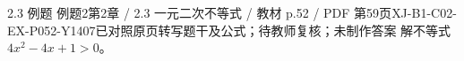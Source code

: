 \par\noindent\begin{minipage}{\linewidth}
\begin{bankitem}{2.3 例题 例题2}{第2章 / 2.3 一元二次不等式 / 教材 p.52 / PDF 第59页}{XJ-B1-C02-EX-P052-Y1407}{已对照原页转写题干及公式；待教师复核；未制作答案}
解不等式 $4x^2-4x+1>0$。
\end{bankitem}
\end{minipage}\par\medskip
